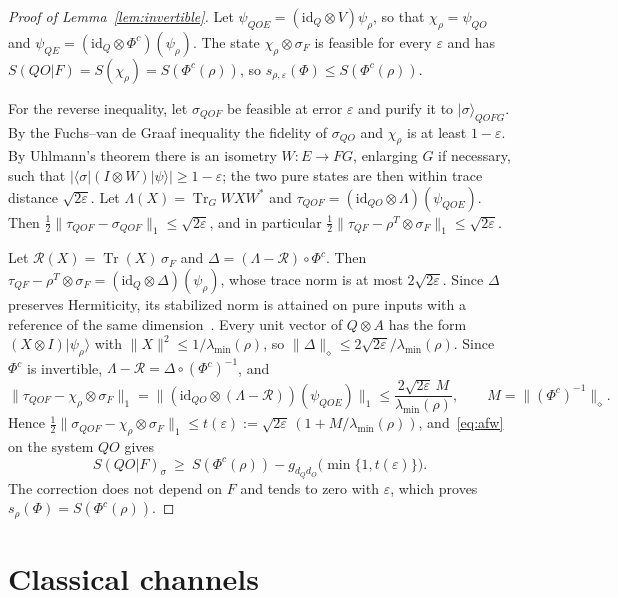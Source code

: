 \documentclass[11pt]{article}
\theoremstyle{definition}
\theoremstyle{remark}
\newcommand{\Tr}{\operatorname{Tr}}
\begin{document}
\begin{proof}[Proof of Lemma~\ref{lem:invertible}]
Let $\psi_{QOE}=(\mathrm{id}_Q\otimes V)\psi_\rho$, so that $\chi_\rho=\psi_{QO}$ and $\psi_{QE}=(\mathrm{id}_Q\otimes\Phi^c)(\psi_\rho)$. The state $\chi_\rho\otimes\sigma_F$ is feasible for every $\varepsilon$ and has $S(QO|F)=S(\chi_\rho)=S(\Phi^c(\rho))$, so $s_{\rho,\varepsilon}(\Phi)\le S(\Phi^c(\rho))$.

For the reverse inequality, let $\sigma_{QOF}$ be feasible at error $\varepsilon$ and purify it to $|\sigma\rangle_{QOFG}$. By the Fuchs--van de Graaf inequality the fidelity of $\sigma_{QO}$ and $\chi_\rho$ is at least $1-\varepsilon$. By Uhlmann's theorem there is an isometry $W:E\to FG$, enlarging $G$ if necessary, such that $|\langle\sigma|(I\otimes W)|\psi\rangle|\ge1-\varepsilon$; the two pure states are then within trace distance $\sqrt{2\varepsilon}$. Let $\Lambda(X)=\Tr_G WXW^*$ and $\tau_{QOF}=(\mathrm{id}_{QO}\otimes\Lambda)(\psi_{QOE})$. Then $\tfrac12\|\tau_{QOF}-\sigma_{QOF}\|_1\le\sqrt{2\varepsilon}$, and in particular $\tfrac12\|\tau_{QF}-\rho^T\otimes\sigma_F\|_1\le\sqrt{2\varepsilon}$.

Let $\mathcal R(X)=\Tr(X)\,\sigma_F$ and $\Delta=(\Lambda-\mathcal R)\circ\Phi^c$. Then $\tau_{QF}-\rho^T\otimes\sigma_F=(\mathrm{id}_Q\otimes\Delta)(\psi_\rho)$, whose trace norm is at most $2\sqrt{2\varepsilon}$. Since $\Delta$ preserves Hermiticity, its stabilized norm is attained on pure inputs with a reference of the same dimension~\cite[Thm.~3.51]{Watrous18}. Every unit vector of $Q\otimes A$ has the form $(X\otimes I)|\psi_\rho\rangle$ with $\|X\|^2\le1/\lambda_{\min}(\rho)$, so $\|\Delta\|_\diamond\le2\sqrt{2\varepsilon}/\lambda_{\min}(\rho)$. Since $\Phi^c$ is invertible, $\Lambda-\mathcal R=\Delta\circ(\Phi^c)^{-1}$, and
\[
\|\tau_{QOF}-\chi_\rho\otimes\sigma_F\|_1=\|(\mathrm{id}_{QO}\otimes(\Lambda-\mathcal R))(\psi_{QOE})\|_1\le\frac{2\sqrt{2\varepsilon}\,M}{\lambda_{\min}(\rho)},\qquad M=\|(\Phi^c)^{-1}\|_\diamond.
\]
Hence $\tfrac12\|\sigma_{QOF}-\chi_\rho\otimes\sigma_F\|_1\le t(\varepsilon):=\sqrt{2\varepsilon}\,(1+M/\lambda_{\min}(\rho))$, and~\eqref{eq:afw} on the system $QO$ gives
\[
S(QO|F)_\sigma\ \ge\ S(\Phi^c(\rho))-g_{d_Qd_O}\bigl(\min\{1,t(\varepsilon)\}\bigr).
\]
The correction does not depend on $F$ and tends to zero with $\varepsilon$, which proves $s_\rho(\Phi)=S(\Phi^c(\rho))$.
\end{proof}

\section{Classical channels}\label{app:classical}
\end{document}
